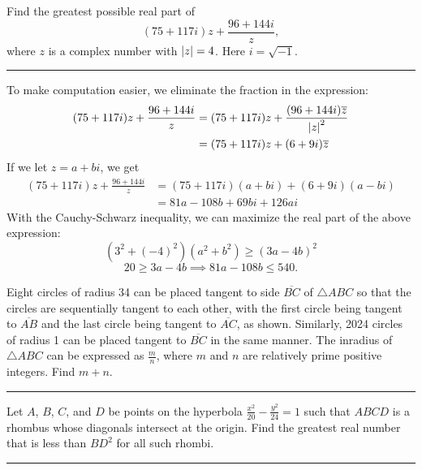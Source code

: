 \documentclass[11pt]{scrartcl}
\begin{document}
\pagebreak

\begin{problem}
    Find the greatest possible real part of
    \[(75 + 117i)z + \frac{96 + 144i}{z},\]
    where $z$ is a complex number with $\left\lvert z \right\rvert = 4$. Here $i = \sqrt{-1}$.
\end{problem}

\rule{\textwidth}{0.4pt}

To make computation easier, we eliminate the fraction in the expression:
\begin{align*}
    (75 + 117i)z + \frac{96 + 144i}{z} &= (75 + 117i)z + \frac{(96 + 144i)\overline{z}}{\left\lvert z \right\rvert^{2}} \\
    &= (75 + 117i)z + (6 + 9i)\overline{z}
\end{align*}
If we let $z = a + bi$, we get
\begin{align*}
    (75 + 117i)z + \frac{96 + 144i}{z} &= (75 + 117i)(a + bi) + (6 + 9i)(a - bi) \\
    &= 81a - 108b + 69bi + 126ai
\end{align*}
With the Cauchy-Schwarz inequality, we can maximize the real part of the above expression:
\[(3^{2} + (-4)^{2})(a^{2} + b^{2}) \geq (3a - 4b)^{2}\]
\[20 \geq 3a - 4b \implies 81a - 108b \leq \boxed{540}.\]

\pagebreak

\begin{problem}
    Eight circles of radius 34 can be placed tangent to side $\overline{BC}$ of $\triangle ABC$ so that the circles are sequentially tangent to each other, with the first circle being tangent to $\overline{AB}$ and the last circle being tangent to $\overline{AC}$, as shown. Similarly, 2024 circles of radius 1 can be placed tangent to $\overline{BC}$ in the same manner. The inradius of $\triangle ABC$ can be expressed as $\frac{m}{n}$, where $m$ and $n$ are relatively prime positive integers. Find $m + n$.
\end{problem}

\rule{\textwidth}{0.4pt}

\pagebreak

\begin{problem}
    Let $A$, $B$, $C$, and $D$ be points on the hyperbola $\frac{x^{2}}{20} - \frac{y^{2}}{24} = 1$ such that $ABCD$ is a rhombus whose diagonals intersect at the origin. Find the greatest real number that is less than $BD^{2}$ for all such rhombi.
\end{problem}

\rule{\textwidth}{0.4pt}
\end{document}
